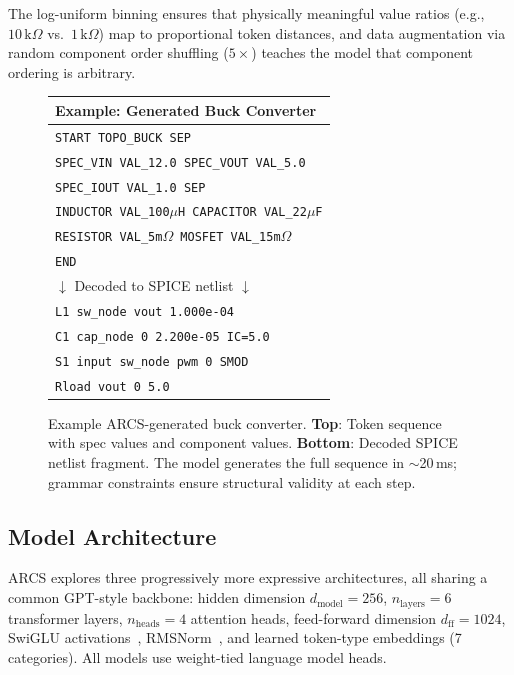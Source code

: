 \documentclass[conference]{IEEEtran}
\begin{document}
The log-uniform binning ensures that physically meaningful value ratios
(e.g., $10\,\text{k}\Omega$ vs.\ $1\,\text{k}\Omega$) map to
proportional token distances, and data augmentation via random component
order shuffling ($5\times$) teaches the model that component ordering
is arbitrary.

\begin{figure}[t]
\centering
\small
\begin{tabular}{@{}l@{}}
\toprule
\textbf{Example: Generated Buck Converter} \\
\midrule
\texttt{START TOPO\_BUCK SEP} \\
\texttt{SPEC\_VIN \colorbox{blue!10}{VAL\_12.0} SPEC\_VOUT \colorbox{blue!10}{VAL\_5.0}} \\
\texttt{SPEC\_IOUT \colorbox{blue!10}{VAL\_1.0} SEP} \\
\texttt{INDUCTOR \colorbox{orange!15}{VAL\_100$\mu$H} CAPACITOR \colorbox{orange!15}{VAL\_22$\mu$F}} \\
\texttt{RESISTOR \colorbox{orange!15}{VAL\_5m$\Omega$} MOSFET \colorbox{orange!15}{VAL\_15m$\Omega$}} \\
\texttt{END} \\
\midrule
\footnotesize $\downarrow$ Decoded to SPICE netlist $\downarrow$ \\
\midrule
\texttt{L1 sw\_node vout 1.000e-04} \\
\texttt{C1 cap\_node 0 2.200e-05 IC=5.0} \\
\texttt{S1 input sw\_node pwm 0 SMOD} \\
\texttt{Rload vout 0 5.0} \\
\bottomrule
\end{tabular}
\caption{Example ARCS-generated buck converter. \textbf{Top}: Token
sequence with \colorbox{blue!10}{spec values} and
\colorbox{orange!15}{component values}. \textbf{Bottom}: Decoded SPICE
netlist fragment. The model generates the full sequence in $\sim$20\,ms;
grammar constraints ensure structural validity at each step.}
\label{fig:example}
\end{figure}

\subsection{Model Architecture}
\label{sec:arch}

ARCS explores three progressively more expressive architectures, all
sharing a common GPT-style backbone: hidden dimension
$d_\text{model}\!=\!256$, $n_\text{layers}\!=\!6$ transformer layers,
$n_\text{heads}\!=\!4$ attention heads, feed-forward dimension
$d_\text{ff}\!=\!1024$, SwiGLU activations~\cite{shazeer2020glu},
RMSNorm~\cite{zhang2019root}, and learned token-type embeddings
(7 categories). All models use weight-tied language model heads.
\end{document}
